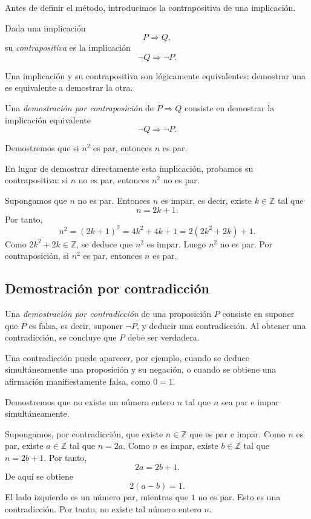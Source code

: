 Antes de definir el método, introducimos la contrapositiva de una implicación.

\begin{definicion}[Contrapositiva]
Dada una implicación
\[
  P\Rightarrow Q,
\]
su \emph{contrapositiva} es la implicación
\[
  \neg Q\Rightarrow \neg P.
\]
\end{definicion}

Una implicación y su contrapositiva son lógicamente equivalentes: demostrar una es equivalente a demostrar la otra.

\begin{definicion}
Una \emph{demostración por contraposición} de $P\Rightarrow Q$ consiste en demostrar la implicación equivalente
\[
  \neg Q\Rightarrow \neg P.
\]
\end{definicion}

\begin{ejemplo}
Demostremos que si $n^2$ es par, entonces $n$ es par.

En lugar de demostrar directamente esta implicación, probamos su contrapositiva: si $n$ no es par, entonces $n^2$ no es par.

Supongamos que $n$ no es par. Entonces $n$ es impar, es decir, existe $k\in\mathbb{Z}$ tal que
\[
  n=2k+1.
\]
Por tanto,
\[
  n^2=(2k+1)^2=4k^2+4k+1=2(2k^2+2k)+1.
\]
Como $2k^2+2k\in\mathbb{Z}$, se deduce que $n^2$ es impar. Luego $n^2$ no es par. Por contraposición, si $n^2$ es par, entonces $n$ es par.
\end{ejemplo}

\subsection{Demostración por contradicción}

\begin{definicion}
Una \emph{demostración por contradicción} de una proposición $P$ consiste en suponer que $P$ es falsa, es decir, suponer $\neg P$, y deducir una contradicción. Al obtener una contradicción, se concluye que $P$ debe ser verdadera.
\end{definicion}

Una contradicción puede aparecer, por ejemplo, cuando se deduce simultáneamente una proposición y su negación, o cuando se obtiene una afirmación manifiestamente falsa, como $0=1$.

\begin{ejemplo}
Demostremos que no existe un número entero $n$ tal que $n$ sea par e impar simultáneamente.

Supongamos, por contradicción, que existe $n\in\mathbb{Z}$ que es par e impar. Como $n$ es par, existe $a\in\mathbb{Z}$ tal que $n=2a$. Como $n$ es impar, existe $b\in\mathbb{Z}$ tal que $n=2b+1$. Por tanto,
\[
  2a=2b+1.
\]
De aquí se obtiene
\[
  2(a-b)=1.
\]
El lado izquierdo es un número par, mientras que $1$ no es par. Esto es una contradicción. Por tanto, no existe tal número entero $n$.
\end{ejemplo}

